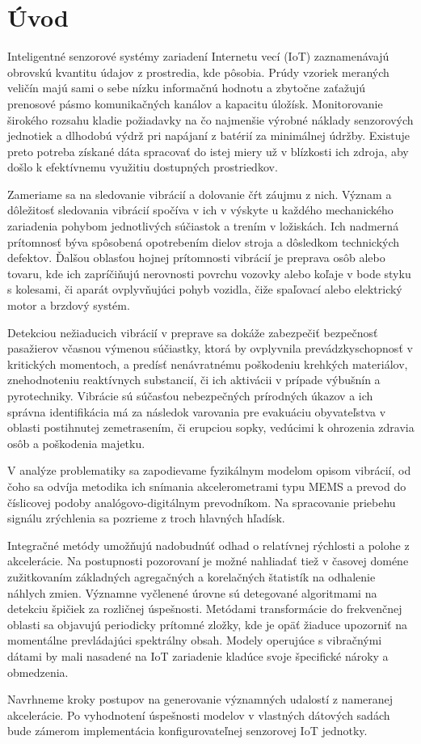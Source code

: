 \chapter{Úvod}
Inteligentné senzorové systémy zariadení Internetu vecí (IoT) zaznamenávajú obrovskú kvantitu údajov z prostredia, kde
pôsobia. Prúdy vzoriek meraných veličín majú sami o sebe nízku informačnú hodnotu a zbytočne zaťažujú
prenosové pásmo komunikačných kanálov a kapacitu úložísk. Monitorovanie širokého rozsahu kladie požiadavky
na čo najmenšie výrobné náklady senzorových jednotiek a dlhodobú výdrž pri napájaní z batérií za minimálnej údržby.
Existuje preto potreba získané dáta spracovať do istej miery už v blízkosti ich zdroja, aby došlo k efektívnemu
využitiu dostupných prostriedkov.

Zameriame sa na sledovanie vibrácií a dolovanie čŕt záujmu z nich. Význam a dôležitosť sledovania vibrácií spočíva v ich v
výskyte u každého mechanického zariadenia pohybom jednotlivých súčiastok a trením v ložiskách. Ich nadmerná prítomnosť
býva spôsobená opotrebením dielov stroja a dôsledkom technických defektov. Ďalšou oblasťou hojnej prítomnosti vibrácií
je preprava osôb alebo tovaru, kde ich zapríčiňujú nerovnosti povrchu vozovky alebo koľaje v bode styku s kolesami, či aparát
ovplyvňujúci pohyb vozidla, čiže spaľovací alebo elektrický motor a brzdový systém.

Detekciou nežiaducich vibrácií v preprave sa dokáže zabezpečiť bezpečnosť pasažierov včasnou výmenou súčiastky,
ktorá by ovplyvnila prevádzkyschopnosť v kritických momentoch, a predísť nenávratnému poškodeniu krehkých materiálov,
znehodnoteniu reaktívnych substancií, či ich aktivácii v prípade výbušnín a pyrotechniky. Vibrácie sú súčasťou
nebezpečných prírodných úkazov a ich správna identifikácia má za následok varovania pre evakuáciu obyvateľstva
v oblasti postihnutej zemetrasením, či erupciou sopky, vedúcimi k ohrozenia zdravia osôb a poškodenia majetku.

V analýze problematiky sa zapodievame fyzikálnym modelom opisom vibrácií, od čoho sa odvíja metodika ich snímania
akcelerometrami typu MEMS a prevod do číslicovej podoby analógovo-digitálnym prevodníkom. Na spracovanie priebehu
signálu zrýchlenia sa pozrieme z troch hlavných hľadísk.

Integračné metódy umožňujú nadobudnúť odhad o relatívnej rýchlosti a polohe z akcelerácie. Na postupnosti pozorovaní
je možné nahliadať tiež v časovej doméne zužitkovaním základných agregačných a korelačných štatistík na odhalenie
náhlych zmien. Významne vyčlenené úrovne sú detegované
algoritmami na detekciu špičiek za rozličnej úspešnosti. Metódami transformácie do frekvenčnej oblasti sa
objavujú periodicky prítomné zložky, kde je opäť žiaduce upozorniť na momentálne prevládajúci spektrálny obsah.
Modely operujúce s vibračnými dátami by mali nasadené na IoT zariadenie kladúce svoje špecifické nároky a
obmedzenia.

Navrhneme kroky postupov na generovanie významných udalostí z nameranej akcelerácie. Po vyhodnotení úspešnosti
modelov v vlastných dátových sadách bude zámerom implementácia konfigurovateľnej senzorovej IoT jednotky.

